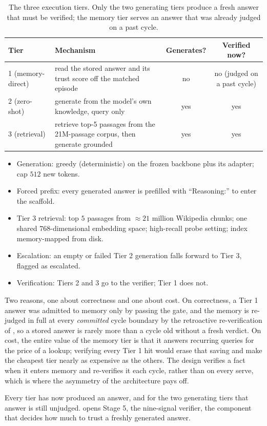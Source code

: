 \begin{table}[htbp]
\centering
\caption[The three tiers compared]{The three execution tiers. Only the two generating
tiers produce a fresh answer that must be verified; the memory tier serves an answer that
was already judged on a past cycle.}
\label{tab:tiers}
\small
\renewcommand{\arraystretch}{1.25}
\begin{tabularx}{\textwidth}{@{}l >{\raggedright\arraybackslash}X c c@{}}
\toprule
\textbf{Tier} & \textbf{Mechanism} & \textbf{Generates?} & \textbf{Verified now?} \\
\midrule
1 (memory-direct) & read the stored answer and its trust score off the matched episode
  & no & no (judged on a past cycle) \\
2 (zero-shot) & generate from the model's own knowledge, query only
  & yes & yes \\
3 (retrieval) & retrieve top-5 passages from the 21M-passage corpus, then generate grounded
  & yes & yes \\
\bottomrule
\end{tabularx}
\end{table}

\begin{bythenumbers}
\begin{itemize}[leftmargin=1.3em, itemsep=1pt]
  \item Generation: greedy (deterministic) on the frozen backbone plus its adapter; cap $512$ new tokens.
  \item Forced prefix: every generated answer is prefilled with ``Reasoning:'' to enter the scaffold.
  \item Tier 3 retrieval: top $5$ passages from $\approx 21$ million Wikipedia chunks; one shared $768$-dimensional embedding space; high-recall probe setting; index memory-mapped from disk.
  \item Escalation: an empty or failed Tier 2 generation falls forward to Tier 3, flagged as escalated.
  \item Verification: Tiers 2 and 3 go to the verifier; Tier 1 does not.
\end{itemize}
\end{bythenumbers}

\begin{defence}
Two reasons, one about correctness and one about cost. On correctness, a Tier 1 answer was
admitted to memory only by passing the gate, and the memory is re-judged in full at every
\emph{committed} cycle boundary by the retroactive re-verification of , so a
stored answer is rarely more than a cycle old without a fresh verdict. On cost, the entire value of the memory
tier is that it answers recurring queries for the price of a lookup; verifying every Tier 1
hit would erase that saving and make the cheapest tier nearly as expensive as the others.
The design verifies a fact when it enters memory and re-verifies it each cycle, rather than
on every serve, which is where the asymmetry of the architecture pays off.
\end{defence}

Every tier has now produced an answer, and for the two generating tiers that answer is still
unjudged.  opens Stage 5, the nine-signal verifier, the component that
decides how much to trust a freshly generated answer.
